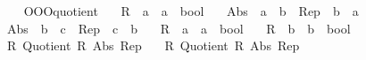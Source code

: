 \begin{isabellebody}
\ \ \ \ \isamarkupfalse%
%
\endisatagproof
{\isafoldproof}%
%
\isadelimproof
\isanewline
%
\endisadelimproof
\isanewline
{}\isamarkupfalse%
%
\isadelimdocument
%
\endisadelimdocument
%
\isatagdocument
%
\isamarkuptrue%
%
\endisatagdocument
{\isafolddocument}%
%
\isadelimdocument
%
\endisadelimdocument
{}\isamarkupfalse%
\ OOO{\isacharunderscore}{\kern0pt}quotient{}{\isacharcolon}{\kern0pt}\isanewline
\ \ \ R{}\ {\isacharcolon}{\kern0pt}{\isacharcolon}{\kern0pt}\ {\isachardoublequoteopen}{\isacharprime}{\kern0pt}a\ {\isasymRightarrow}\ {\isacharprime}{\kern0pt}a\ {\isasymRightarrow}\ bool{\isachardoublequoteclose}\isanewline
\ \ \ Abs{}\ {\isacharcolon}{\kern0pt}{\isacharcolon}{\kern0pt}\ {\isachardoublequoteopen}{\isacharprime}{\kern0pt}a\ {\isasymRightarrow}\ {\isacharprime}{\kern0pt}b{\isachardoublequoteclose}\ \ Rep{}\ {\isacharcolon}{\kern0pt}{\isacharcolon}{\kern0pt}\ {\isachardoublequoteopen}{\isacharprime}{\kern0pt}b\ {\isasymRightarrow}\ {\isacharprime}{\kern0pt}a{\isachardoublequoteclose}\isanewline
\ \ \ Abs{}\ {\isacharcolon}{\kern0pt}{\isacharcolon}{\kern0pt}\ {\isachardoublequoteopen}{\isacharprime}{\kern0pt}b\ {\isasymRightarrow}\ {\isacharprime}{\kern0pt}c{\isachardoublequoteclose}\ \ Rep{}\ {\isacharcolon}{\kern0pt}{\isacharcolon}{\kern0pt}\ {\isachardoublequoteopen}{\isacharprime}{\kern0pt}c\ {\isasymRightarrow}\ {\isacharprime}{\kern0pt}b{\isachardoublequoteclose}\isanewline
\ \ \ R{}{\isacharprime}{\kern0pt}\ {\isacharcolon}{\kern0pt}{\isacharcolon}{\kern0pt}\ {\isachardoublequoteopen}{\isacharprime}{\kern0pt}a\ {\isasymRightarrow}\ {\isacharprime}{\kern0pt}a\ {\isasymRightarrow}\ bool{\isachardoublequoteclose}\isanewline
\ \ \ R{}\ {\isacharcolon}{\kern0pt}{\isacharcolon}{\kern0pt}\ {\isachardoublequoteopen}{\isacharprime}{\kern0pt}b\ {\isasymRightarrow}\ {\isacharprime}{\kern0pt}b\ {\isasymRightarrow}\ bool{\isachardoublequoteclose}\isanewline
\ \ \ R{}{\isacharcolon}{\kern0pt}\ {\isachardoublequoteopen}Quotient{}\ R{}\ Abs{}\ Rep{}{\isachardoublequoteclose}\isanewline
\ \ \ R{}{\isacharcolon}{\kern0pt}\ {\isachardoublequoteopen}Quotient{}\ R{}\ Abs{}\ Rep{}{\isachardoublequoteclose}\isanewline

\end{isabellebody}
